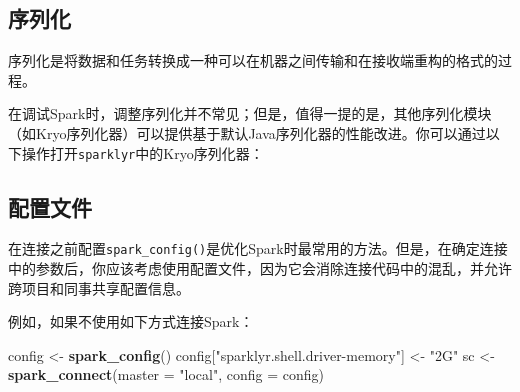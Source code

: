\documentclass[
]{article}
\newenvironment{Shaded}{\begin{snugshade}}{\end{snugshade}}
\newcommand{\DataTypeTok}[1]{\textcolor[rgb]{0.13,0.29,0.53}{#1}}
\newcommand{\DecValTok}[1]{\textcolor[rgb]{0.00,0.00,0.81}{#1}}
\newcommand{\KeywordTok}[1]{\textcolor[rgb]{0.13,0.29,0.53}{\textbf{#1}}}
\newcommand{\NormalTok}[1]{#1}
\newcommand{\OperatorTok}[1]{\textcolor[rgb]{0.81,0.36,0.00}{\textbf{#1}}}
\newcommand{\StringTok}[1]{\textcolor[rgb]{0.31,0.60,0.02}{#1}}
\begin{document}
\begin{Shaded}
\end{Shaded}

\hypertarget{ux5e8fux5217ux5316}{%
\subsection{序列化}\label{ux5e8fux5217ux5316}}

序列化是将数据和任务转换成一种可以在机器之间传输和在接收端重构的格式的过程。

在调试Spark时，调整序列化并不常见；但是，值得一提的是，其他序列化模块（如Kryo序列化器）可以提供基于默认Java序列化器的性能改进。你可以通过以下操作打开\texttt{sparklyr}中的Kryo序列化器：

\begin{Shaded}
\end{Shaded}

\hypertarget{ux914dux7f6eux6587ux4ef6}{%
\subsection{配置文件}\label{ux914dux7f6eux6587ux4ef6}}

在连接之前配置\texttt{spark\_config()}是优化Spark时最常用的方法。但是，在确定连接中的参数后，你应该考虑使用配置文件，因为它会消除连接代码中的混乱，并允许跨项目和同事共享配置信息。

例如，如果不使用如下方式连接Spark：

\begin{Shaded}
\begin{Highlighting}[]
\NormalTok{config <-}\StringTok{ }\KeywordTok{spark_config}\NormalTok{()}
\NormalTok{config[}\StringTok{"sparklyr.shell.driver-memory"}\NormalTok{] <-}\StringTok{ "2G"}
\NormalTok{sc <-}\StringTok{ }\KeywordTok{spark_connect}\NormalTok{(}\DataTypeTok{master =} \StringTok{"local"}\NormalTok{, }\DataTypeTok{config =}\NormalTok{ config)}
\end{Highlighting}
\end{Shaded}
\end{document}
